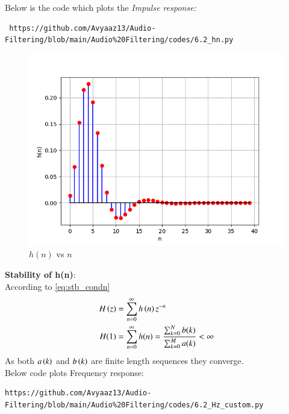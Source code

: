 \documentclass[journal,12pt,twocolumn]{IEEEtran}
\theoremstyle{remark}
\renewcommand\thesection{\arabic{section}}
\numberwithin{equation}{subsection}
\begin{document}
\begin{enumerate}[label=\thesection.\arabic*]

Below is the code which plots the {\em Impulse response:}
\begin{lstlisting}
 https://github.com/Avyaaz13/Audio-Filtering/blob/main/Audio%20Filtering/codes/6.2_hn.py
 \end{lstlisting}
\begin{figure}[!ht]
\centering
\includegraphics[width=\columnwidth]{figs/h(n)_custom.png}
\caption{$h(n)$ vs $n$}
\label{fig:hn_custom}
\end{figure}
\textbf{Stability of h(n)}:\\
According to \eqref{eq:stb_condn}
\begin{align}
H\left(z\right) &= \sum_{n = 0}^{\infty} h\left(n\right)z^{-n}\\
H(1)&= \sum_{n = 0}^{\infty}h(n)  = \frac{\sum_{k = 0}^{N}b(k)}{\sum_{k = 0}^{M}a(k)}< \infty
\end{align}
As both $a\left(k\right)$ and $b\left(k\right)$ are finite length sequences they converge.\\
Below code plots Frequency response:
\begin{lstlisting}
https://github.com/Avyaaz13/Audio-Filtering/blob/main/Audio%20Filtering/codes/6.2_Hz_custom.py
\end{lstlisting}
\begin{figure}[H]
\centering

\end{figure}
\end{enumerate}
\end{document}
